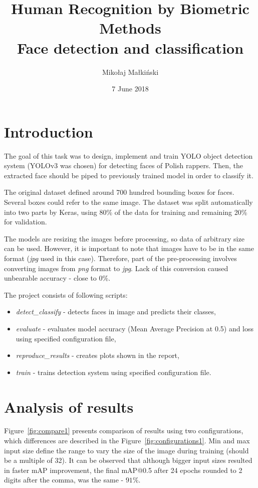 \documentclass{article}
\title{
\textbf{Human Recognition by Biometric Methods}\\
\bigskip
\textbf{Face detection and classification}\\
\bigskip
}
\author{Mikołaj Małkiński}
\date{7 June 2018}
\begin{document}
    \maketitle

    \section{Introduction}\label{sec:introduction}

    The goal of this task was to design, implement and train YOLO object detection system (YOLOv3 was chosen) for detecting faces of Polish rappers.
    Then, the extracted face should be piped to previously trained model in order to classify it.

    The original dataset defined around 700 hundred bounding boxes for faces.
    Several boxes could refer to the same image.
    The dataset was split automatically into two parts by Keras, using 80\% of the data for training and remaining 20\% for validation.

    The models are resizing the images before processing, so data of arbitrary size can be used.
    However, it is important to note that images have to be in the same format (\textit{jpg} used in this case).
    Therefore, part of the pre-processing involves converting images from \textit{png} format to \textit{jpg}.
    Lack of this conversion caused unbearable accuracy - close to 0\%.

    The project consists of following scripts:
    \begin{itemize}
        \item \textit{detect\_classify} - detects faces in image and predicts their classes,
        \item \textit{evaluate} - evaluates model accuracy (Mean Average Precision at 0.5) and loss using specified configuration file,
        \item \textit{reproduce\_results} - creates plots shown in the report,
        \item \textit{train} - trains detection system using specified configuration file.
    \end{itemize}

    \newpage

    \section{Analysis of results}\label{sec:analysisOfResults}

    Figure~\ref{fig:compare1} presents comparison of results using two configurations, which differences are described in the Figure~\ref{fig:configurations1}.
    Min and max input size define the range to vary the size of the image during training (should be a multiple of 32).
    It can be observed that although bigger input sizes resulted in faster mAP improvement, the final mAP@0.5 after 24 epochs rounded to 2 digits after the comma, was the same - $91\%$.
\end{document}
